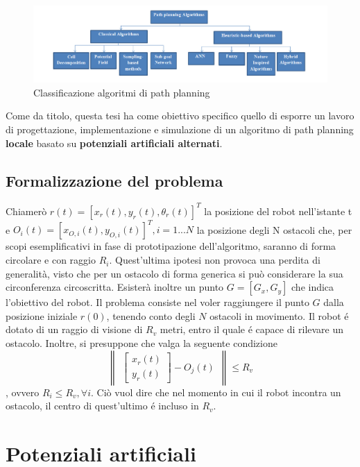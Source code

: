 \documentclass[14pt,twoside,a4paper]{extarticle}
\begin{document}
\begin{figure}[H]
\caption{Classificazione algoritmi di path planning\cite{mac2016}}
\includegraphics[width=\textwidth]{algoritmiPP.png}
\end{figure}

Come da titolo, questa tesi ha come obiettivo specifico quello di esporre un lavoro di progettazione, implementazione e simulazione di un algoritmo di path planning \textbf{locale} basato su \textbf{potenziali artificiali alternati}. 

\subsection{Formalizzazione del problema}

Chiamerò \( r(t) = [x_r(t),y_r(t),\theta_r(t)]^T\) la posizione del robot nell'istante t e \( O_i(t) = [x_{O,i}(t),y_{O,i}(t)]^T, i = 1...N\) la posizione degli N ostacoli che, per scopi esemplificativi in fase di prototipazione dell'algoritmo, saranno di forma circolare e con raggio \(R_i\). Quest'ultima ipotesi non provoca una perdita di generalità, visto che per un ostacolo di forma generica si può considerare la sua circonferenza circoscritta. Esisterà inoltre un punto \(G = [G_x, G_y]\) che indica l'obiettivo del robot. Il problema consiste nel voler raggiungere il punto \(G\) dalla posizione iniziale \(r(0)\), tenendo conto degli \(N\) ostacoli in movimento. Il robot é dotato di un raggio di visione di \(R_v\) metri, entro il quale é capace di rilevare un ostacolo. Inoltre, si presuppone che valga la seguente condizione
\[\begin{Vmatrix}\begin{bmatrix} x_r(t)\\ y_r(t) \end{bmatrix} - O_j(t)\end{Vmatrix} \leq R_v \], ovvero \( R_i \leq R_v, \forall i\). Ciò vuol dire che nel momento in cui il robot incontra un ostacolo, il centro di quest'ultimo é incluso in \(R_v\).

\section{Potenziali artificiali}
\end{document}
